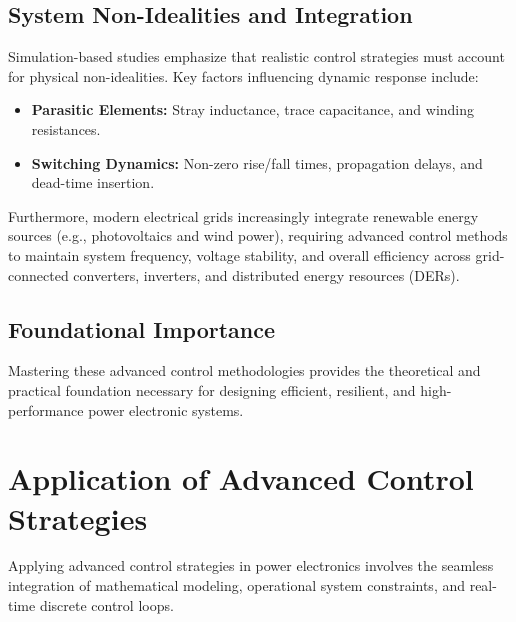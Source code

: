 \documentclass[12pt,a4paper]{article}
\begin{document}
\subsection{System Non-Idealities and Integration}
Simulation-based studies emphasize that realistic control strategies must account for physical non-idealities. Key factors influencing dynamic response include:
\begin{itemize}
    \item \textbf{Parasitic Elements:} Stray inductance, trace capacitance, and winding resistances.
    \item \textbf{Switching Dynamics:} Non-zero rise/fall times, propagation delays, and dead-time insertion.
\end{itemize}

Furthermore, modern electrical grids increasingly integrate renewable energy sources (e.g., photovoltaics and wind power), requiring advanced control methods to maintain system frequency, voltage stability, and overall efficiency across grid-connected converters, inverters, and distributed energy resources (DERs).

\subsection{Foundational Importance}
Mastering these advanced control methodologies provides the theoretical and practical foundation necessary for designing efficient, resilient, and high-performance power electronic systems.

\section{Application of Advanced Control Strategies}

Applying advanced control strategies in power electronics involves the seamless integration of mathematical modeling, operational system constraints, and real-time discrete control loops.
\end{document}
